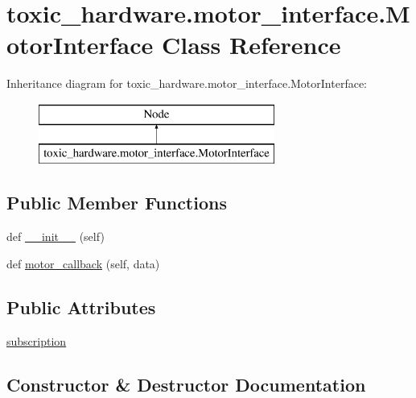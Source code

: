 \hypertarget{classtoxic__hardware_1_1motor__interface_1_1MotorInterface}{}\section{toxic\+\_\+hardware.\+motor\+\_\+interface.\+Motor\+Interface Class Reference}
\label{classtoxic__hardware_1_1motor__interface_1_1MotorInterface}
Inheritance diagram for toxic\+\_\+hardware.\+motor\+\_\+interface.\+Motor\+Interface\+:\begin{figure}[H]
\begin{center}
\leavevmode
\includegraphics[height=2.000000cm]{d6/dfb/classtoxic__hardware_1_1motor__interface_1_1MotorInterface}
\end{center}
\end{figure}
\subsection*{Public Member Functions}
\begin{DoxyCompactItemize}
\item 
def \mbox{\hyperlink{classtoxic__hardware_1_1motor__interface_1_1MotorInterface_a8264a67be5aa9dbecbe12d06bd1b6b29}{\+\_\+\+\_\+init\+\_\+\+\_\+}} (self)
\item 
def \mbox{\hyperlink{classtoxic__hardware_1_1motor__interface_1_1MotorInterface_a03f00bab38c0702cf53e679ef2ae8216}{motor\+\_\+callback}} (self, data)
\end{DoxyCompactItemize}
\subsection*{Public Attributes}
\begin{DoxyCompactItemize}
\item 
\mbox{\hyperlink{classtoxic__hardware_1_1motor__interface_1_1MotorInterface_afb6296197761247831d86469a6b783dc}{subscription}}
\end{DoxyCompactItemize}


\subsection{Constructor \& Destructor Documentation}
\mbox{\label{classtoxic__hardware_1_1motor__interface_1_1MotorInterface_a8264a67be5aa9dbecbe12d06bd1b6b29}} 
